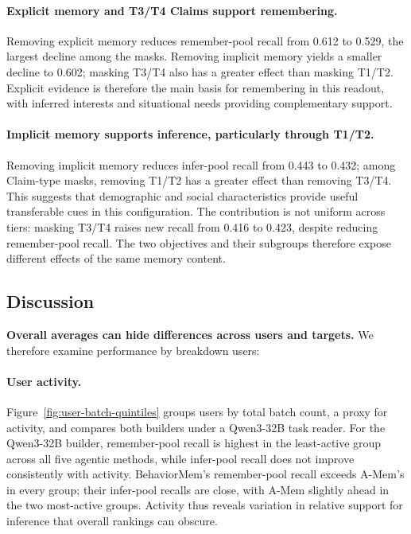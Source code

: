 \documentclass[sigconf,nonacm,balance=false]{acmart}
\begin{document}
\paragraph{\textbf{Explicit memory and T3/T4 Claims support remembering.}}
Removing explicit memory reduces remember-pool recall from 0.612 to 0.529, the largest decline among the masks. Removing implicit memory yields a smaller decline to 0.602; masking T3/T4 also has a greater effect than masking T1/T2. Explicit evidence is therefore the main basis for remembering in this readout, with inferred interests and situational needs providing complementary support.


\paragraph{\textbf{Implicit memory supports inference, particularly through T1/T2.}}
Removing implicit memory reduces infer-pool recall from 0.443 to 0.432; among Claim-type masks, removing T1/T2 has a greater effect than removing T3/T4. This suggests that demographic and social characteristics provide useful transferable cues in this configuration. The contribution is not uniform across tiers: masking T3/T4 raises new recall from 0.416 to 0.423, despite reducing remember-pool recall. The two objectives and their subgroups therefore expose different effects of the same memory content.



\subsection{Discussion}
\label{sec:discussion}
\label{sec:memory-strategy-comparison}
\textbf{Overall averages can hide differences across users and targets.} We therefore examine performance by breakdown users:

\paragraph{\textbf{User activity.}}
\label{sec:user-history-analysis}
Figure~\ref{fig:user-batch-quintiles} groups users by total batch count, a proxy for activity, and compares both builders under a Qwen3-32B task reader. For the Qwen3-32B builder, remember-pool recall is highest in the least-active group across all five agentic methods, while infer-pool recall does not improve consistently with activity. BehaviorMem's remember-pool recall exceeds A-Mem's in every group; their infer-pool recalls are close, with A-Mem slightly ahead in the two most-active groups. Activity thus reveals variation in relative support for inference that overall rankings can obscure.
\end{document}
